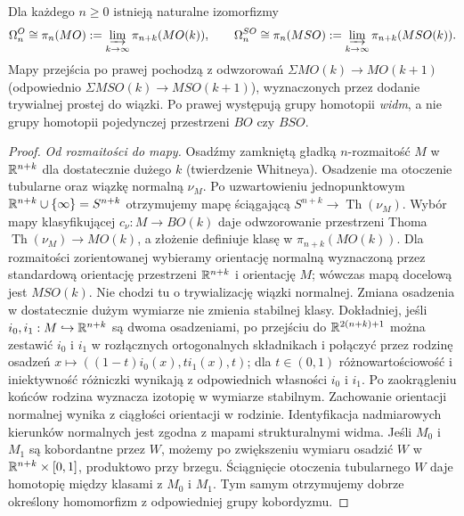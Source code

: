 \begin{twierdzenie}
\label{thm:pt-MO-v9}
Dla każdego $n\ge0$ istnieją naturalne izomorfizmy
\[
\Omega_n^O\cong\pi_n(MO):=
\varinjlim_{k\to\infty}\pi_{n+k}(MO(k)),
\qquad
\Omega_n^{SO}\cong\pi_n(MSO):=
\varinjlim_{k\to\infty}\pi_{n+k}(MSO(k)).
\]
Mapy przejścia po prawej pochodzą z odwzorowań
$\Sigma MO(k)\to MO(k+1)$ (odpowiednio
$\Sigma MSO(k)\to MSO(k+1)$), wyznaczonych
przez dodanie trywialnej prostej do wiązki.
Po prawej występują grupy homotopii \emph{widm},
a nie grupy homotopii pojedynczej przestrzeni $BO$
czy $BSO$.
\end{twierdzenie}
\begin{proof}
\emph{Od rozmaitości do mapy.}
Osadźmy zamkniętą gładką $n$-rozmaitość
$M$ w $\mathbb{R}^{n+k}$ dla dostatecznie dużego $k$
(twierdzenie Whitneya). Osadzenie ma otoczenie
tubularne oraz wiązkę normalną $\nu_M$.
Po uzwartowieniu jednopunktowym
$\mathbb{R}^{n+k}\cup\{\infty\}=S^{n+k}$ otrzymujemy mapę ściągającą
$S^{n+k}\to\operatorname{Th}(\nu_M)$.
Wybór mapy klasyfikującej
$c_\nu:M\to BO(k)$ daje odwzorowanie przestrzeni
Thoma $\operatorname{Th}(\nu_M)\to MO(k)$,
a złożenie definiuje klasę w $\pi_{n+k}(MO(k))$.
Dla rozmaitości zorientowanej wybieramy orientację normalną
wyznaczoną przez standardową orientację przestrzeni
$\mathbb{R}^{n+k}$ i orientację $M$; wówczas mapą docelową jest
$MSO(k)$. Nie chodzi tu o trywializację wiązki normalnej.
Zmiana osadzenia w dostatecznie dużym wymiarze nie
zmienia stabilnej klasy. Dokładniej, jeśli
$i_0,i_1:M\hookrightarrow\mathbb{R}^{n+k}$ są dwoma osadzeniami,
po przejściu do $\mathbb{R}^{2(n+k)+1}$ można zestawić
$i_0$ i $i_1$ w rozłącznych ortogonalnych składnikach
i połączyć przez rodzinę osadzeń
$x\mapsto((1-t)i_0(x),t i_1(x),t)$; dla $t\in(0,1)$
różnowartościowość i iniektywność różniczki wynikają
z odpowiednich własności $i_0$ i $i_1$.
Po zaokrągleniu końców rodzina wyznacza izotopię
w wymiarze stabilnym. Zachowanie orientacji
normalnej wynika z ciągłości orientacji w rodzinie.
Identyfikacja nadmiarowych kierunków normalnych
jest zgodna z mapami strukturalnymi widma.
Jeśli $M_0$ i $M_1$ są kobordantne przez $W$,
możemy po zwiększeniu wymiaru osadzić $W$ w
$\mathbb{R}^{n+k}\times[0,1]$, produktowo przy brzegu.
Ściągnięcie otoczenia tubularnego $W$ daje homotopię
między klasami z $M_0$ i $M_1$. Tym samym
otrzymujemy dobrze określony homomorfizm z
odpowiedniej grupy kobordyzmu.


\end{proof}
